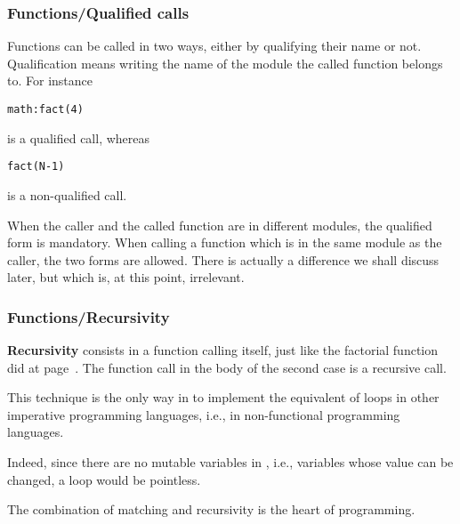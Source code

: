 %
\begin{frame}[containsverbatim]
\frametitle{Functions/Qualified calls}

Functions can be called in two ways, either by qualifying their name
or not. Qualification means writing the name of the module the called
function belongs to. For instance 
\begin{verbatim}
math:fact(4)
\end{verbatim}
is a qualified call, whereas
\begin{verbatim}
fact(N-1)
\end{verbatim}
is a non-qualified call.

\bigskip

When the caller and the called function are in different modules, the
qualified form is mandatory. When calling a function which is in the
same module as the caller, the two forms are allowed. There is
actually a difference we shall discuss later, but which is, at this
point, irrelevant.

\end{frame}

%
\begin{frame}
\frametitle{Functions/Recursivity}

\textbf{Recursivity} consists in a function calling itself, just like
the factorial function did at page~\pageref{fact}. The function call
in the body of the second case is a recursive call.

\bigskip

This technique is the only way in \Erlang to implement the equivalent
of loops in other imperative programming languages, i.e., in
non-functional programming languages. 

\bigskip

Indeed, since there are no mutable variables in \Erlang,
i.e., variables whose value can be changed, a loop would be pointless.

\bigskip

The combination of matching and recursivity is the heart of \Erlang
programming.

\end{frame}
